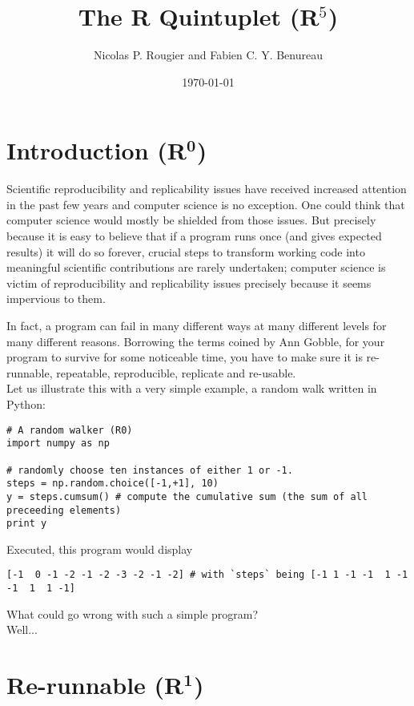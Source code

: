 \documentclass[a4paper,11pt]{article}
\title{The R Quintuplet (R$^5$)}
\author{Nicolas P. Rougier and Fabien C. Y. Benureau}
\date{\today}
\begin{document}
\maketitle

\section*{Introduction (R$^{\mathbf 0}$)}

Scientific reproducibility and replicability issues have received increased attention in the past few years and computer science is no exception.
One could think that computer science would mostly be shielded from those issues. 
But precisely because it is easy to believe that if a program runs once (and gives expected results) it will do so forever, crucial steps to transform working code into meaningful scientific contributions are rarely undertaken; computer science is victim of reproducibility and replicability issues precisely because it seems impervious to them.

In fact, a program can fail in many different ways at many different levels for many different reasons.
Borrowing the terms coined by Ann Gobble, for your program to survive for some noticeable time, you have to make sure it is re-runnable, repeatable, reproducible, replicate and re-usable.\\

Let us illustrate this with a very simple example, a random walk written in Python:

\begin{lstlisting}
# A random walker (R0)
import numpy as np

# randomly choose ten instances of either 1 or -1. 
steps = np.random.choice([-1,+1], 10)
y = steps.cumsum() # compute the cumulative sum (the sum of all preceeding elements)
print y
\end{lstlisting}

Executed, this program would display 
\begin{lstlisting}
[-1  0 -1 -2 -1 -2 -3 -2 -1 -2] # with `steps` being [-1 1 -1 -1  1 -1 -1  1  1 -1]
\end{lstlisting}

What could go wrong with such a simple program?\\
\vfill
Well...
\vfill


\clearpage
\section*{Re-runnable (R$^{\mathbf 1}$)}
\end{document}
